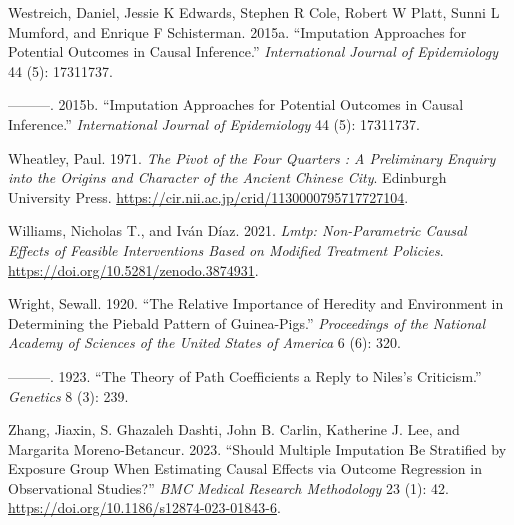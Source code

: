 \documentclass[
  singlecolumn]{report}
\newlength{\cslhangindent}
\newlength{\cslentryspacingunit} %
\newenvironment{CSLReferences}[2] %
 {%
  \setlength{\parindent}{0pt}
  \ifodd #1
  \let\oldpar\par
  \def\par{\hangindent=\cslhangindent\oldpar}
  \fi
  \setlength{\parskip}{#2\cslentryspacingunit}
 }%
 {}
\begin{document}
\begin{CSLReferences}{1}{0}
\leavevmode{}%
Westreich, Daniel, Jessie K Edwards, Stephen R Cole, Robert W Platt,
Sunni L Mumford, and Enrique F Schisterman. 2015a. {``Imputation
Approaches for Potential Outcomes in Causal Inference.''}
\emph{International Journal of Epidemiology} 44 (5): 17311737.

\leavevmode{}%
---------. 2015b. {``Imputation Approaches for Potential Outcomes in
Causal Inference.''} \emph{International Journal of Epidemiology} 44
(5): 17311737.

\leavevmode{}%
Wheatley, Paul. 1971. \emph{The Pivot of the Four Quarters : A
Preliminary Enquiry into the Origins and Character of the Ancient
Chinese City}. Edinburgh University Press.
\url{https://cir.nii.ac.jp/crid/1130000795717727104}.

\leavevmode{}%
Williams, Nicholas T., and Iván Díaz. 2021. \emph{Lmtp: Non-Parametric
Causal Effects of Feasible Interventions Based on Modified Treatment
Policies}. \url{https://doi.org/10.5281/zenodo.3874931}.

\leavevmode{}%
Wright, Sewall. 1920. {``The Relative Importance of Heredity and
Environment in Determining the Piebald Pattern of Guinea-Pigs.''}
\emph{Proceedings of the National Academy of Sciences of the United
States of America} 6 (6): 320.

\leavevmode{}%
---------. 1923. {``The Theory of Path Coefficients a Reply to Niles's
Criticism.''} \emph{Genetics} 8 (3): 239.

\leavevmode{}%
Zhang, Jiaxin, S. Ghazaleh Dashti, John B. Carlin, Katherine J. Lee, and
Margarita Moreno-Betancur. 2023. {``Should Multiple Imputation Be
Stratified by Exposure Group When Estimating Causal Effects via Outcome
Regression in Observational Studies?''} \emph{BMC Medical Research
Methodology} 23 (1): 42.
\url{https://doi.org/10.1186/s12874-023-01843-6}.

\end{CSLReferences}
\end{document}

